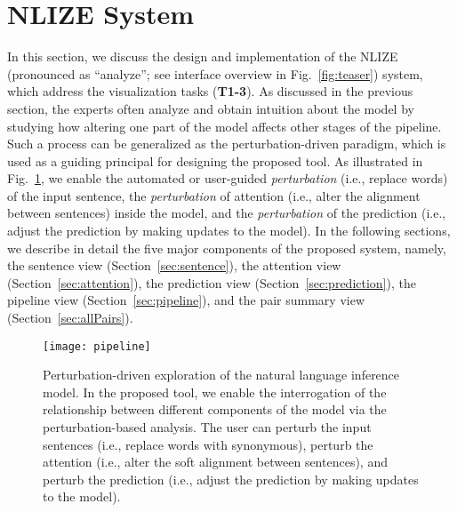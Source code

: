 

\section{NLIZE System}
In this section, we discuss the design and implementation of the NLIZE (pronounced as ``analyze''; see interface overview in Fig.~\ref{fig:teaser}) system, which address the visualization tasks (\textbf{T1-3}).
%
As discussed in the previous section, the experts often analyze and obtain intuition about the model by studying how altering one part of the model affects other stages of the pipeline.
%
Such a process can be generalized as the perturbation-driven paradigm, which is used as a guiding principal for designing the proposed tool.
%
As illustrated in Fig.~\ref{fig:modelPipeline}, we enable the automated or user-guided \emph{perturbation} (i.e., replace words) of the input sentence, the \emph{perturbation} of attention (i.e., alter the alignment between sentences) inside the model, and the \emph{perturbation} of the prediction (i.e., adjust the prediction by making updates to the model).
%
In the following sections, we describe in detail the five major components of the proposed system, namely, the sentence view  (Section~\ref{sec:sentence}), the attention view (Section~\ref{sec:attention}), the prediction view (Section~\ref{sec:prediction}), the pipeline view (Section~\ref{sec:pipeline}), and the pair summary view (Section~\ref{sec:allPairs}).

\begin{figure}[htbp]
\vspace{-2mm}
\centering
 \texttt{[image: pipeline]}
 \vspace{-5mm}
 \caption{
 Perturbation-driven exploration of the natural language inference model.
 In the proposed tool, we enable the interrogation of the relationship between different components of the model via the perturbation-based analysis.
 The user can perturb the input sentences (i.e., replace words with synonymous), perturb the attention (i.e., alter the soft alignment between sentences), and perturb the prediction (i.e., adjust the prediction by making updates to the model).
}
\vspace{-2mm}
\label{fig:modelPipeline}
\end{figure}



%

